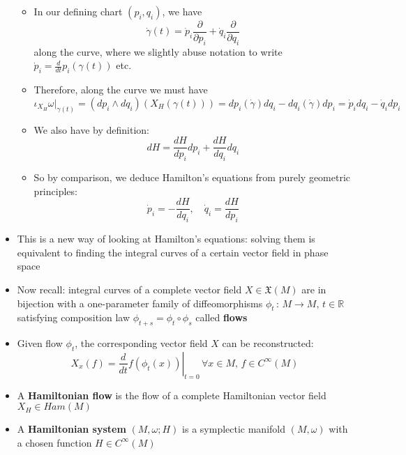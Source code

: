 \documentclass[12pt,a4paper]{article}
\numberwithin{equation}{section}
\begin{document}
\begin{itemize}
\begin{itemize}
			\item In our defining chart $(p_{i},q_{i})$, we have
			\begin{equation}
				\dot{\gamma}(t)=\dot{p}_{i}\frac{\partial}{\partial p_{i}}+\dot{q}_{i}\frac{\partial}{\partial q_{i}}
			\end{equation}
			along the curve, where we slightly abuse notation to write $\dot{p}_{i}=\frac{d}{dt}p_{i}(\gamma(t))$ etc.
			\item Therefore, along the curve we must have
			\begin{equation}
				\iota_{X_{H}}\omega\vert_{\gamma(t)}=(dp_{i}\wedge dq_{i})(X_{H}(\gamma(t)))=dp_{i}(\dot{\gamma})dq_{i}-dq_{i}(\dot{\gamma})dp_{i}=\dot{p}_{i}dq_{i}-\dot{q}_{i}dp_{i}
			\end{equation}
			\item We also have by definition:
			\begin{equation}
				dH=\frac{dH}{dp_{i}}dp_{i}+\frac{dH}{dq_{i}}dq_{i}
			\end{equation}
			\item So by comparison, we deduce Hamilton's equations from purely geometric principles:
			\begin{equation}
				\dot{p}_{i}=-\frac{dH}{dq_{i}},\quad\dot{q}_{i}=\frac{dH}{dp_{i}}
			\end{equation}
		\end{itemize}
		\item This is a new way of looking at Hamilton's equations: solving them is equivalent to finding the integral curves of a certain vector field in phase space
		\item Now recall: integral curves of a complete vector field $X\in\mathfrak{X}(M)$ are in bijection with a one-parameter family of diffeomorphisms $\phi_{t}\,:\,M\to M,\,t\in \mathbb{R}$ satisfying composition law $\phi_{t+s}=\phi_{t}\circ\phi_{s}$ called \textbf{flows}
		\item Given flow $\phi_{t}$, the corresponding vector field $X$ can be reconstructed:
		\begin{equation}
			X_{x}(f)=\left.\frac{d}{dt}f(\phi_{t}(x))\right\rvert_{t=0}\,\forall x\in M,\,f\in C^{\infty}(M)
		\end{equation}
		\item A \textbf{Hamiltonian flow} is the flow of a complete Hamiltonian vector field $X_{H}\in Ham(M)$
		\item A \textbf{Hamiltonian system} $(M,\omega;H)$ is a symplectic manifold $(M,\omega)$ with a chosen function $H\in C^{\infty}(M)$

\end{itemize}
\end{document}
